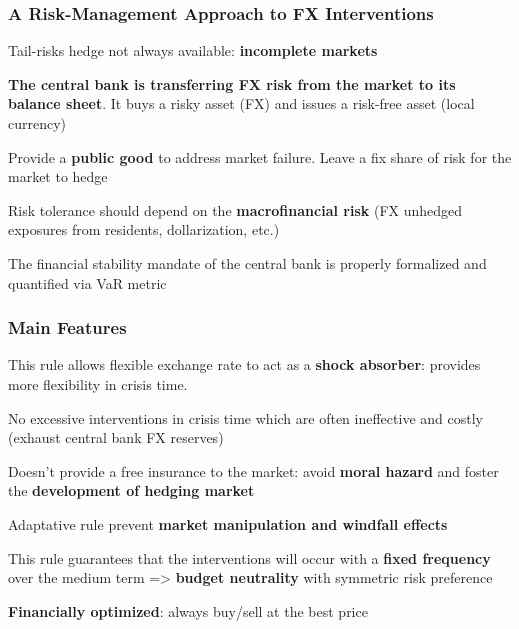 \documentclass{beamer}
\newenvironment{largeitemize}{\itemize\addtolength{\itemsep}{10pt}}{\enditemize}
\newenvironment{largeenumerate}{\enumerate\addtolength{\itemsep}{10pt}}{\endenumerate}
\begin{document}
\begin{frame}
  \frametitle{A Risk-Management Approach to FX Interventions}
  \begin{largeitemize}    
  \item Tail-risks hedge not always available: \textbf{incomplete markets}
    \item \textbf{The central bank is transferring FX risk from the market to
      its balance sheet}. It buys a risky asset (FX) and issues a risk-free asset
      (local currency)    
    \item Provide a \textbf{public good} to address market failure. Leave a
      fix share of risk for the market to hedge 
    \item Risk tolerance should depend on the \textbf{macrofinancial risk} (FX
      unhedged exposures from residents, dollarization, etc.) 
    \item The financial stability mandate of the central bank is properly
      formalized and quantified via VaR metric
  \end{largeitemize}  
\end{frame}

\begin{frame}
    \frametitle{Main Features}
  \begin{largeenumerate}
  \item This rule allows flexible exchange rate to act as a \textbf{shock absorber}:
    provides more flexibility in crisis time.
  \item No excessive interventions in crisis time which are often ineffective
    and costly (exhaust central bank FX reserves)
  \item Doesn't provide a free insurance to the market: avoid \textbf{moral
      hazard} and foster the \textbf{development of hedging market}
  \item Adaptative rule prevent \textbf{market manipulation and windfall effects}
  \item This rule guarantees that the interventions will occur with a \textbf{fixed
        frequency} over the medium term => \textbf{budget neutrality} with
      symmetric risk preference
  \item \textbf{Financially optimized}: always buy/sell at the best price
  \end{largeenumerate}  
\end{frame}
\end{document}
